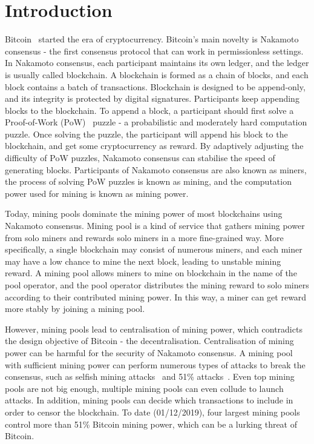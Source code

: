 \section{Introduction}
\label{sec:intro}

Bitcoin~\cite{nakamoto2008bitcoin} started the era of cryptocurrency.
Bitcoin's main novelty is Nakamoto consensus - the first consensus protocol that can work in permissionless settings.
In Nakamoto consensus, each participant maintains its own ledger, and the ledger is usually called blockchain.
A blockchain is formed as a chain of blocks, and each block contains a batch of transactions.
Blockchain is designed to be append-only, and its integrity is protected by digital signatures.
Participants keep appending blocks to the blockchain.
To append a block, a participant should first solve a Proof-of-Work (PoW)~\cite{dwork1992pricing} puzzle - a probabilistic and moderately hard computation puzzle.
Once solving the puzzle, the participant will append his block to the blockchain, and get some cryptocurrency as reward.
By adaptively adjusting the difficulty of PoW puzzles, Nakamoto consensus can stabilise the speed of generating blocks.
Participants of Nakamoto consensus are also known as miners, the process of solving PoW puzzles is known as mining, and the computation power used for mining is known as mining power.

Today, mining pools dominate the mining power of most blockchains using Nakamoto consensus.
Mining pool is a kind of service that gathers mining power from solo miners and rewards solo miners in a more fine-grained way.
More specifically, a single blockchain may consist of numerous miners, and each miner may have a low chance to mine the next block, leading to unstable mining reward.
A mining pool allows miners to mine on blockchain in the name of the pool operator, and the pool operator distributes the mining reward to solo miners according to their contributed mining power.
In this way, a miner can get reward more stably by joining a mining pool.

However, mining pools lead to centralisation of mining power, which contradicts the design objective of Bitcoin - the decentralisation.
Centralisation of mining power can be harmful for the security of Nakamoto consensus.
A mining pool with sufficient mining power can perform numerous types of attacks to break the consensus, such as selfish mining attacks~\cite{eyal2018majority} and 51\% attacks~\cite{nakamoto2008bitcoin}.
Even top mining pools are not big enough, multiple mining pools can even collude to launch attacks.
In addition, mining pools can decide which transactions to include in order to censor the blockchain.
To date (01/12/2019), four largest mining pools control more than 51\% Bitcoin mining power, which can be a lurking threat of Bitcoin.




